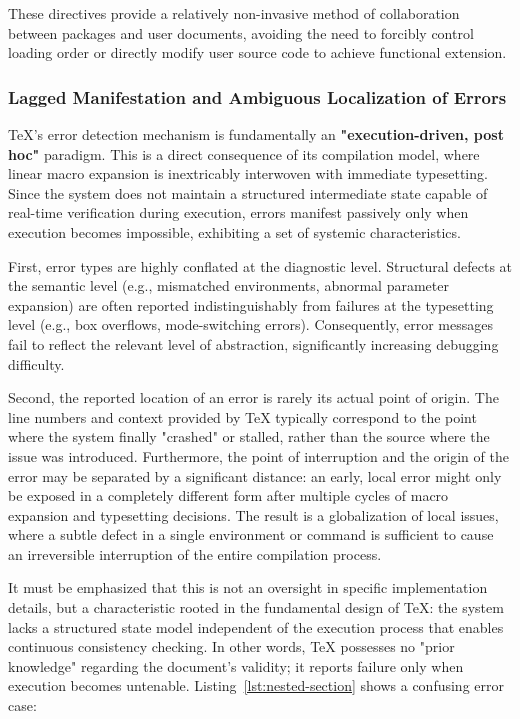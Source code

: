 These directives provide a relatively non-invasive method of collaboration between packages and user documents, avoiding the need to forcibly control loading order or directly modify user source code to achieve functional extension.

\subsubsection{Lagged Manifestation and Ambiguous Localization of Errors}

\TeX{}'s error detection mechanism is fundamentally an \textbf{"execution-driven, post hoc"} paradigm. This is a direct consequence of its compilation model, where linear macro expansion is inextricably interwoven with immediate typesetting. Since the system does not maintain a structured intermediate state capable of real-time verification during execution, errors manifest passively only when execution becomes impossible, exhibiting a set of systemic characteristics.

First, error types are highly conflated at the diagnostic level. Structural defects at the semantic level (e.g., mismatched environments, abnormal parameter expansion) are often reported indistinguishably from failures at the typesetting level (e.g., box overflows, mode-switching errors). Consequently, error messages fail to reflect the relevant level of abstraction, significantly increasing debugging difficulty.

Second, the reported location of an error is rarely its actual point of origin. The line numbers and context provided by \TeX{} typically correspond to the point where the system finally "crashed" or stalled, rather than the source where the issue was introduced. Furthermore, the point of interruption and the origin of the error may be separated by a significant distance: an early, local error might only be exposed in a completely different form after multiple cycles of macro expansion and typesetting decisions. The result is a globalization of local issues, where a subtle defect in a single environment or command is sufficient to cause an irreversible interruption of the entire compilation process.

It must be emphasized that this is not an oversight in specific implementation details, but a characteristic rooted in the fundamental design of \TeX{}: the system lacks a structured state model independent of the execution process that enables continuous consistency checking. In other words, \TeX{} possesses no "prior knowledge" regarding the document's validity; it reports failure only when execution becomes untenable. Listing~\ref{lst:nested-section} shows a confusing error case:

